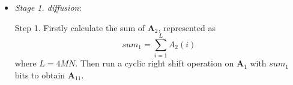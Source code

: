 \documentclass[final,3p,times,twocolumn]{elsarticle}
\begin{document}
\begin{itemize}
	\item \emph{Stage 1. diffusion}:
	
%			
%			
%			
	
	Step 1. Firstly calculate the sum of $\bm{A}_2$, represented as
	\begin{equation}
	sum_1 = \sum\limits_{i= 1}^{L} A_2(i)
	\label{eq:sum1}
	\end{equation}
	where $L=4MN$. Then run a cyclic right shift operation on $\bm{A}_1$ with $sum_1$ bits to obtain $\bm{A}_{11}$.
	

\end{itemize}
\end{document}
